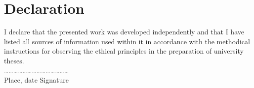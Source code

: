 \hspace{0pt}
\vfill
\section*{Declaration}





I declare that the presented work was developed independently and that I have listed all sources of information used within it in accordance with the methodical instructions for observing the ethical principles in the preparation of university theses.\\[1.0cm]

\dots\dots\dots\dots\dots\dots\dots  \hfill \dots\dots\dots\dots\dots\dots\dots \\
Place, date  \hfill Signature\\